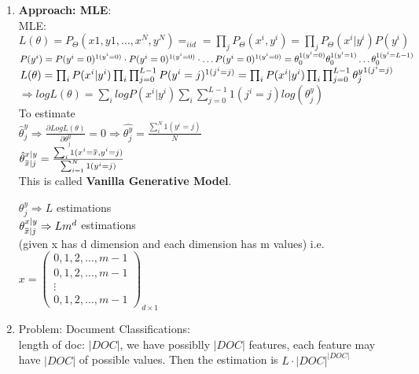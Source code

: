 \documentclass[12pt]{article}
\newcommand{\overbar}[1]{\mkern 1.5mu\overline{\mkern-1.5mu#1\mkern-1.5mu}\mkern 1.5mu}
\begin{document}
\begin{enumerate}
            \item \textbf{Approach: MLE}:\\
            MLE: $L(\theta) = P_\Theta(x1,y1, \dots, x^N,y^N) =_{iid} = \prod_j P_\Theta(x^i,y^i)  = \prod_j P_\Theta(x^i|y^i)P(y^i)$\\
            $P(y^i) = P(y^i = 0)^{1(y^i = 0)}\cdot P(y^i = 0)^{1(y^i = 0)}\cdot \dots P(y^i = 0)^{1(y^i = 0)} \\
            = \theta_0^{1(y^i = 0)}\theta_0^{1(y^i = 1)}\dots \theta_0^{1(y^i = L-1)} $\\
            $L(\theta) = \prod_i P(x^i|y^i) \prod_i \prod_{j=0}^{L-1} P(y^i = j)^{1(j^i = j)} \\
            = \prod_i P(x^i|y^i) \prod_i \prod_{j=0}^{L-1} {\theta_j^y}^{1(j^i = j)} \\$
            $ \Rightarrow logL(\theta) = \sum_i logP(x^i|y^i) \sum_i \sum_{j=0}^{L-1} {1(j^i = j)}log({\theta_j^y}) $\\
            To estimate \\
            $\hat{\theta}^y_j \Rightarrow \frac{\partial LogL(\theta)}{\partial \theta^y_j} = 0 \Rightarrow \hat{\theta^y_j}= \frac{\sum_i^N 1(y^i = j)}{N}$\\
            $\hat{\theta}^{x|y}_{\overbar{x}|j} =  \frac{\sum_i 1(x^i = \overbar{x}, y^i = j)}{\sum_{i = 1}^N 1(y^i = j)}$\\
            This is called \textbf{Vanilla Generative Model}.

            $\theta^y_j \Rightarrow L$ estimations\\
            $\theta^{x|y}_{\overbar{x}|j} \Rightarrow Lm^d$ estimations \\(given x has d dimension and each dimension has m values) i.e. 
            $x = \begin{pmatrix}
                0,1,2,\dots, m - 1 \\ 0,1,2,\dots, m - 1 \\ \vdots \\ 0,1,2,\dots, m - 1
            \end{pmatrix}_{d\times 1}$

            \item Problem: Document Classifications:\\
            length of doc: $|DOC|$, we have possiblly $|DOC|$ features, each feature may have $|DOC|$ of possible values. Then the estimation is $L\cdot|DOC|^{|DOC|}$


\end{enumerate}
\end{document}
